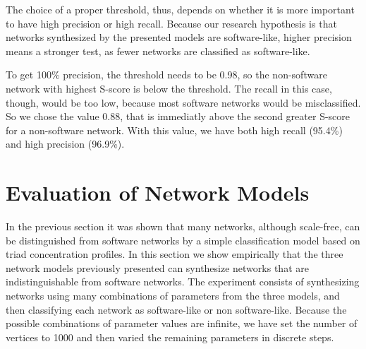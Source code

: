 The choice of a proper threshold, thus, depends on whether it is more important
to have high precision or high recall. Because our research hypothesis is that
networks synthesized by the presented models are software-like, higher precision
means a stronger test, as fewer networks are classified as software-like.

To get 100\% precision, the threshold needs to be 0.98, so the non-software
network with highest S-score is below the threshold. The recall in this case,
though, would be too low, because most software networks would be misclassified.
So we chose the value 0.88, that is immediatly above the second greater S-score
for a non-software network. With this value, we have both high recall (95.4\%)
and high precision (96.9\%).



\section{Evaluation of Network Models} \label{sec:evaluation}

In the previous section it was shown that many networks, although scale-free,
can be distinguished from software networks by a simple classification model
based on triad concentration profiles. In this section we show empirically that
the three network models previously presented can synthesize networks that are
indistinguishable from software networks. The experiment consists of
synthesizing networks using many combinations of parameters from the three
models, and then classifying each network as software-like or non software-like.
%
Because the possible combinations of parameter values are infinite, we have set
the number of vertices to 1000 and then varied the remaining parameters in
discrete steps.

